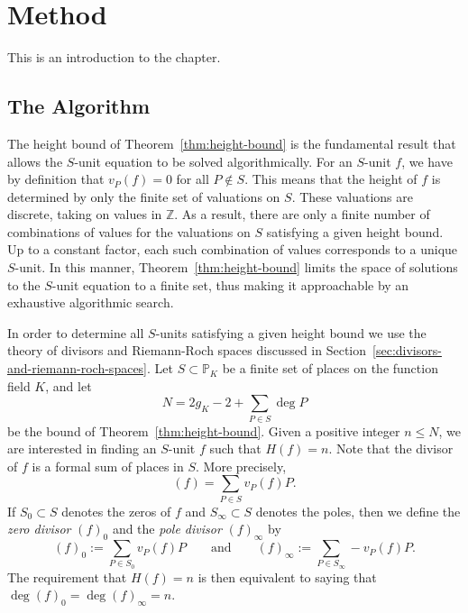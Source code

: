 
\chapter{Method}%
\label{chap:method}

This is an introduction to the chapter.

\section{The Algorithm}%
\label{sec:the-algorithm}

The height bound of Theorem~\ref{thm:height-bound} is the fundamental result that allows the \(S\)-unit equation to be solved algorithmically. For an \(S\)-unit \(f\), we have by definition that \(v_{P}(f) = 0\) for all \(P \notin S\). This means that the height of \(f\) is determined by only the finite set of valuations on \(S\). These valuations are discrete, taking on values in \(\mathbb{Z}\). As a result, there are only a finite number of combinations of values for the valuations on \(S\) satisfying a given height bound. Up to a constant factor, each such combination of values corresponds to a unique \(S\)-unit. In this manner, Theorem~\ref{thm:height-bound} limits the space of solutions to the \(S\)-unit equation to a finite set, thus making it approachable by an exhaustive algorithmic search.

In order to determine all \(S\)-units satisfying a given height bound we use the theory of divisors and Riemann-Roch spaces discussed in Section~\ref{sec:divisors-and-riemann-roch-spaces}. Let \(S \subset \mathbb{P}_{K}\) be a finite set of places on the function field \(K\), and let
\[N = 2g_{K} - 2 + \sum_{P \in S} \deg{P}\]
be the bound of Theorem~\ref{thm:height-bound}. Given a positive integer \(n \leq N\), we are interested in finding an \(S\)-unit \(f\) such that \(H(f) = n\). Note that the divisor of \(f\) is a formal sum of places in \(S\). More precisely,
\[(f) = \sum_{P \in S} v_{P}(f) P.\]
If \(S_{0} \subset S\) denotes the zeros of \(f\) and \(S_{\infty} \subset S\) denotes the poles, then we define the \textit{zero divisor} \({(f)}_{0}\) and the \textit{pole divisor} \({(f)}_{\infty}\) by
\[{(f)}_{0} := \sum_{P \in S_{0}} v_{P}(f) P \qquad \text{and} \qquad {(f)}_{\infty} := \sum_{P \in S_{\infty}} - v_{P}(f) P.\]
The requirement that \(H(f) = n\) is then equivalent to saying that \(\deg{{(f)}_{0}} = \deg{{(f)}_{\infty}} = n\).

